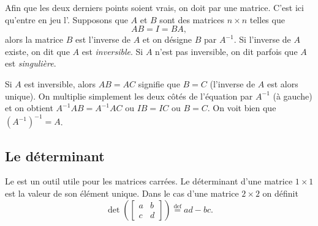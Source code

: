 Afin que les deux derniers points soient vrais, on doit  par une matrice. C’est ici qu’entre en jeu l’\emph{}. Supposons que $A$ et $B$ sont des matrices $n \times n$ telles que
\begin{equation*}
AB = I = BA ,
\end{equation*}
alors la matrice $B$ est l'inverse de $A$ et on désigne $B$ par $A^{-1}$.
Si l’inverse de $A$ existe, on dit que $A$ est
\emph{inversible}.
Si $A$ n’est pas inversible, on dit parfois que $A$ est
\emph{singulière}.

Si $A$ est inversible, alors $AB = AC$ signifie que
$B = C$ (l’inverse de $A$ est alors unique).
On multiplie simplement les deux côtés de l’équation par $A^{-1}$ (à gauche) et on obtient
$A^{-1}AB = A^{-1}AC$ ou $IB=IC$ ou $B=C$.
On voit bien que ${(A^{-1})}^{-1} = A$.

\subsection{Le déterminant}

Le \emph{} est un outil utile pour les matrices carrées. Le déterminant d’une matrice $1 \times 1$ est la valeur de son élément unique. Dans le cas d'une matrice $2 \times 2$ on définit
\begin{equation*}
\det \left(
\begin{bmatrix}
a & b \\
c & d
\end{bmatrix}
\right)
\overset{\text{def}}{=}
ad-bc .
\end{equation*}

